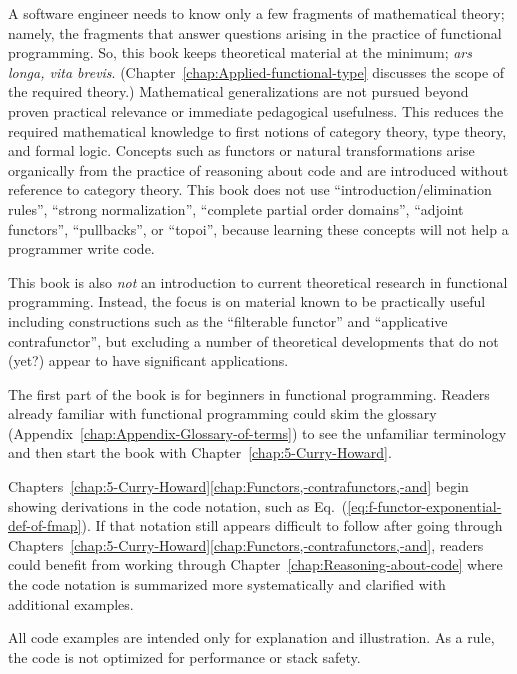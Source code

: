 A software engineer needs to know only a few fragments of mathematical
theory; namely, the fragments that answer questions arising in the
practice of functional programming. So, this book keeps theoretical
material at the minimum; \emph{ars longa, vita brevis}. (Chapter~\ref{chap:Applied-functional-type}
discusses the scope of the required theory.) Mathematical generalizations
are not pursued beyond proven practical relevance or immediate pedagogical
usefulness. This reduces the required mathematical knowledge to first
notions of category theory, type theory, and formal logic. Concepts
such as functors or natural transformations arise organically from
the practice of reasoning about code and are introduced without reference
to category theory. This book does not use \textsf{``}introduction/elimination
rules\textsf{''}, \textsf{``}strong normalization\textsf{''}, \textsf{``}complete partial order domains\textsf{''},
\textsf{``}adjoint functors\textsf{''}, \textsf{``}pullbacks\textsf{''}, or \textsf{``}topoi\textsf{''}, because learning
these concepts will not help a programmer write code. 

This book is also \emph{not} an introduction to current theoretical
research in functional programming. Instead, the focus is on material
known to be practically useful \textemdash{} including constructions
such as the \textsf{``}filterable functor\textsf{''} and \textsf{``}applicative contrafunctor\textsf{''},
but excluding a number of theoretical developments that do not (yet?)
appear to have significant applications.

The first part of the book is for beginners in functional programming.
Readers already familiar with functional programming could skim the
glossary (Appendix~\ref{chap:Appendix-Glossary-of-terms}) to see
the unfamiliar terminology and then start the book with Chapter~\ref{chap:5-Curry-Howard}.

Chapters~\ref{chap:5-Curry-Howard}\textendash \ref{chap:Functors,-contrafunctors,-and}
begin showing derivations in the code notation, such as Eq.~(\ref{eq:f-functor-exponential-def-of-fmap}).
If that notation still appears difficult to follow after going through
Chapters~\ref{chap:5-Curry-Howard}\textendash \ref{chap:Functors,-contrafunctors,-and},
readers could benefit from working through Chapter~\ref{chap:Reasoning-about-code}
where the code notation is summarized more systematically and clarified
with additional examples.

All code examples are intended only for explanation and illustration.
As a rule, the code is not optimized for performance or stack safety.

